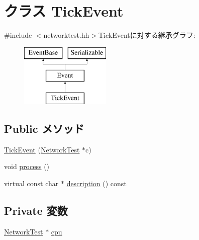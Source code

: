 \hypertarget{classNetworkTest_1_1TickEvent}{
\section{クラス TickEvent}
\label{classNetworkTest_1_1TickEvent}
}


{\ttfamily \#include $<$networktest.hh$>$}TickEventに対する継承グラフ:\begin{figure}[H]
\begin{center}
\leavevmode
\includegraphics[height=3cm]{classNetworkTest_1_1TickEvent}
\end{center}
\end{figure}
\subsection*{Public メソッド}
\begin{DoxyCompactItemize}
\item 
\hyperlink{classNetworkTest_1_1TickEvent_af46127e855fadb2a94134f8d2cc97339}{TickEvent} (\hyperlink{classNetworkTest_1_1NetworkTest}{NetworkTest} $\ast$c)
\item 
void \hyperlink{classNetworkTest_1_1TickEvent_a2e9c5136d19b1a95fc427e0852deab5c}{process} ()
\item 
virtual const char $\ast$ \hyperlink{classNetworkTest_1_1TickEvent_a130ddddf003422b413e2e891b1b80e8f}{description} () const 
\end{DoxyCompactItemize}
\subsection*{Private 変数}
\begin{DoxyCompactItemize}
\item 
\hyperlink{classNetworkTest_1_1NetworkTest}{NetworkTest} $\ast$ \hyperlink{classNetworkTest_1_1TickEvent_a36811e442ce4f0283f33634e61733b28}{cpu}
\end{DoxyCompactItemize}


